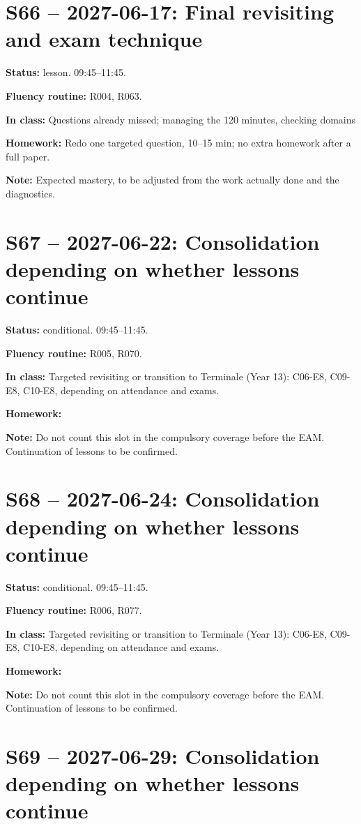 \section*{S66 -- 2027-06-17: Final revisiting and exam technique}
\textbf{Status:} lesson. 09:45–11:45.\par\textbf{Fluency routine:} R004, R063.\par\textbf{In class:} Questions already missed; managing the 120 minutes, checking domains\par\textbf{Homework:} Redo one targeted question, 10–15 min; no extra homework after a full paper.\par\textbf{Note:} Expected mastery, to be adjusted from the work actually done and the diagnostics.
\section*{S67 -- 2027-06-22: Consolidation depending on whether lessons continue}
\textbf{Status:} conditional. 09:45–11:45.\par\textbf{Fluency routine:} R005, R070.\par\textbf{In class:} Targeted revisiting or transition to Terminale (Year 13): C06-E8, C09-E8, C10-E8, depending on attendance and exams.\par\textbf{Homework:} \par\textbf{Note:} Do not count this slot in the compulsory coverage before the EAM. Continuation of lessons to be confirmed.
\section*{S68 -- 2027-06-24: Consolidation depending on whether lessons continue}
\textbf{Status:} conditional. 09:45–11:45.\par\textbf{Fluency routine:} R006, R077.\par\textbf{In class:} Targeted revisiting or transition to Terminale (Year 13): C06-E8, C09-E8, C10-E8, depending on attendance and exams.\par\textbf{Homework:} \par\textbf{Note:} Do not count this slot in the compulsory coverage before the EAM. Continuation of lessons to be confirmed.
\section*{S69 -- 2027-06-29: Consolidation depending on whether lessons continue}
